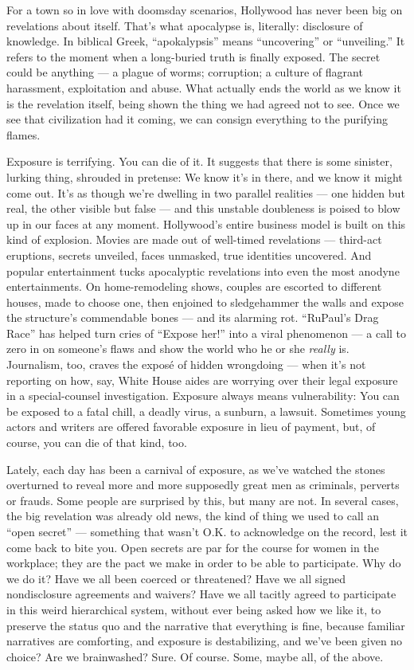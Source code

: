 For a town so in love with doomsday scenarios, Hollywood has never been
big on revelations about itself. That's what apocalypse is, literally:
disclosure of knowledge. In biblical Greek, ``apokalypsis'' means
``uncovering'' or ``unveiling.'' It refers to the moment when a
long-buried truth is finally exposed. The secret could be anything --- a
plague of worms; corruption; a culture of flagrant harassment,
exploitation and abuse. What actually ends the world as we know it is
the revelation itself, being shown the thing we had agreed not to see.
Once we see that civilization had it coming, we can consign everything
to the purifying flames.

Exposure is terrifying. You can die of it. It suggests that there is
some sinister, lurking thing, shrouded in pretense: We know it's in
there, and we know it might come out. It's as though we're dwelling in
two parallel realities --- one hidden but real, the other visible but
false --- and this unstable doubleness is poised to blow up in our faces
at any moment. Hollywood's entire business model is built on this kind
of explosion. Movies are made out of well-timed revelations ---
third-act eruptions, secrets unveiled, faces unmasked, true identities
uncovered. And popular entertainment tucks apocalyptic revelations into
even the most anodyne entertainments. On home-remodeling shows, couples
are escorted to different houses, made to choose one, then enjoined to
sledgehammer the walls and expose the structure's commendable bones ---
and its alarming rot. ``RuPaul's Drag Race'' has helped turn cries of
``Expose her!'' into a viral phenomenon --- a call to zero in on
someone's flaws and show the world who he or she \emph{really} is.
Journalism, too, craves the exposé of hidden wrongdoing --- when it's
not reporting on how, say, White House aides are worrying over their
legal exposure in a special-counsel investigation. Exposure always means
vulnerability: You can be exposed to a fatal chill, a deadly virus, a
sunburn, a lawsuit. Sometimes young actors and writers are offered
favorable exposure in lieu of payment, but, of course, you can die of
that kind, too.

Lately, each day has been a carnival of exposure, as we've watched the
stones overturned to reveal more and more supposedly great men as
criminals, perverts or frauds. Some people are surprised by this, but
many are not. In several cases, the big revelation was already old news,
the kind of thing we used to call an ``open secret'' --- something that
wasn't O.K. to acknowledge on the record, lest it come back to bite you.
Open secrets are par for the course for women in the workplace; they are
the pact we make in order to be able to participate. Why do we do it?
Have we all been coerced or threatened? Have we all signed nondisclosure
agreements and waivers? Have we all tacitly agreed to participate in
this weird hierarchical system, without ever being asked how we like it,
to preserve the status quo and the narrative that everything is fine,
because familiar narratives are comforting, and exposure is
destabilizing, and we've been given no choice? Are we brainwashed? Sure.
Of course. Some, maybe all, of the above.

